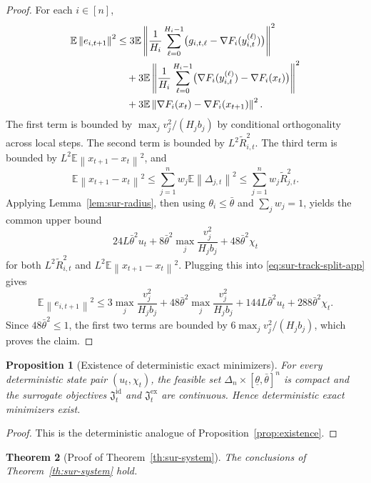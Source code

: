 \documentclass{article}
\newtheorem{theorem}{Theorem}[section]
\newtheorem{proposition}[theorem]{Proposition}
\theoremstyle{definition}
\newcommand{\EE}{\mathbb E}
\newcommand{\norm}[1]{\left\lVert #1\right\rVert}
\begin{document}
\begin{proof}
For each $i\in[n]$,
\begin{align}
\EE\norm{e_{i,t+1}}^2
&\le
3\EE\left\|
\frac1{H_i}\sum_{\ell=0}^{H_i-1}
\bigl(g_{i,t,\ell}-\nabla F_i(y_{i,t}^{(\ell)})\bigr)
\right\|^2
\notag\\
&\quad+
3\EE\left\|
\frac1{H_i}\sum_{\ell=0}^{H_i-1}
\bigl(\nabla F_i(y_{i,t}^{(\ell)})-\nabla F_i(x_t)\bigr)
\right\|^2
\notag\\
&\quad+
3\EE\norm{\nabla F_i(x_t)-\nabla F_i(x_{t+1})}^2.
\label{eq:sur-track-split-app}
\end{align}
The first term is bounded by $\max_j v_j^2/(H_j b_j)$ by conditional
orthogonality across local steps. The second term is bounded by
$L^2\widetilde R_{i,t}^2$. The third term is bounded by
$L^2\EE\norm{x_{t+1}-x_t}^2$, and
\[
\EE\norm{x_{t+1}-x_t}^2
\le
\sum_{j=1}^n w_j\EE\norm{\Delta_{j,t}}^2
\le
\sum_{j=1}^n w_j\widetilde R_{j,t}^2.
\]
Applying Lemma~\ref{lem:sur-radius}, then using $\theta_i\le \bar\theta$ and
$\sum_j w_j=1$, yields the common upper bound
\[
24L\bar\theta^2u_t
+
8\bar\theta^2\max_j\frac{v_j^2}{H_j b_j}
+
48\bar\theta^2\chi_t
\]
for both $L^2\widetilde R_{i,t}^2$ and $L^2\EE\norm{x_{t+1}-x_t}^2$. Plugging
this into \eqref{eq:sur-track-split-app} gives
\[
\EE\norm{e_{i,t+1}}^2
\le
3\max_j\frac{v_j^2}{H_j b_j}
+
48\bar\theta^2\max_j\frac{v_j^2}{H_j b_j}
+
144L\bar\theta^2u_t
+
288\bar\theta^2\chi_t.
\]
Since $48\bar\theta^2\le 1$, the first two terms are bounded by
$6\max_j v_j^2/(H_jb_j)$, which proves the claim.
\end{proof}

\begin{proposition}[Existence of deterministic exact minimizers]
\label{prop:sur-existence}
For every deterministic state pair $(u_t,\chi_t)$, the feasible set
$\Delta_n\times[\underline\theta,\bar\theta]^n$ is compact and the surrogate
objectives $\mathfrak J_t^{\mathrm{id}}$ and $\mathfrak J_t^{\mathrm{ex}}$ are
continuous. Hence deterministic exact minimizers exist.
\end{proposition}

\begin{proof}
This is the deterministic analogue of Proposition~\ref{prop:existence}.
\end{proof}

\begin{theorem}[Proof of Theorem~\ref{th:sur-system}]
\label{th:sur-system-proof}
The conclusions of Theorem~\ref{th:sur-system} hold.
\end{theorem}
\end{document}
